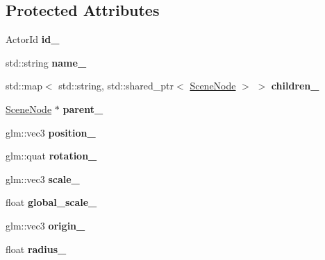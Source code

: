 \subsection*{Protected Attributes}
\begin{DoxyCompactItemize}
\item 
\mbox{\label{classTarbora_1_1SceneNode_a9432d7afb4256f34d05a947d73fd36a5}} 
Actor\+Id {\bfseries id\+\_\+}
\item 
\mbox{\label{classTarbora_1_1SceneNode_a73e6fbba6218f5b3f739b74fd36a1490}} 
std\+::string {\bfseries name\+\_\+}
\item 
\mbox{\label{classTarbora_1_1SceneNode_a023b1ecdc817d49475003b6c18e8340d}} 
std\+::map$<$ std\+::string, std\+::shared\+\_\+ptr$<$ \hyperlink{classTarbora_1_1SceneNode}{Scene\+Node} $>$ $>$ {\bfseries children\+\_\+}
\item 
\mbox{\label{classTarbora_1_1SceneNode_adaa560b8bcf270c2b443f8f8c7cdaa35}} 
\hyperlink{classTarbora_1_1SceneNode}{Scene\+Node} $\ast$ {\bfseries parent\+\_\+}
\item 
\mbox{\label{classTarbora_1_1SceneNode_ab70a006bc1c86995ebb2e657c9a45ee9}} 
glm\+::vec3 {\bfseries position\+\_\+}
\item 
\mbox{\label{classTarbora_1_1SceneNode_a75263c64acd53e86dcecc6a5b3165835}} 
glm\+::quat {\bfseries rotation\+\_\+}
\item 
\mbox{\label{classTarbora_1_1SceneNode_a50fe08135eb77ca0583a72402a16cbbe}} 
glm\+::vec3 {\bfseries scale\+\_\+}
\item 
\mbox{\label{classTarbora_1_1SceneNode_afba9afc0d19c85bef4de320d8f05be5c}} 
float {\bfseries global\+\_\+scale\+\_\+}
\item 
\mbox{\label{classTarbora_1_1SceneNode_a5946ac3c4bcb661acf4d0e429e2532b1}} 
glm\+::vec3 {\bfseries origin\+\_\+}
\item 
\mbox{\label{classTarbora_1_1SceneNode_af86fdbfafb4b4c212ebd3b9fd1ab3835}} 
float {\bfseries radius\+\_\+}
\end{DoxyCompactItemize}
